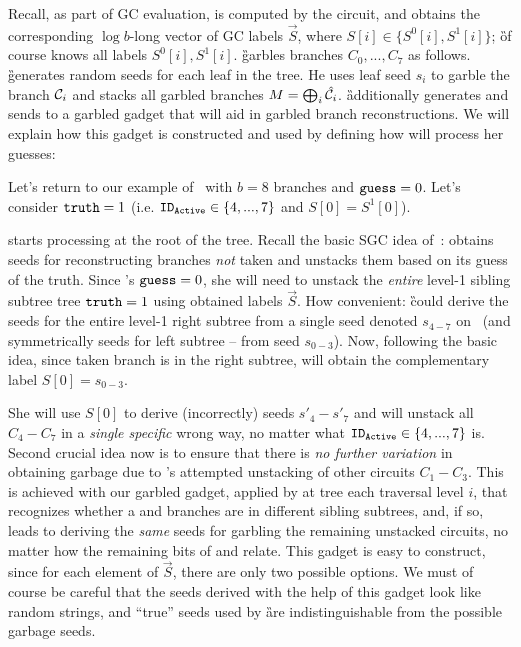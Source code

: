 
Recall, as part of GC  evaluation, \aid is computed by the circuit, and \E obtains the corresponding $ \log b$-long vector of GC labels $\vec S$, where
$S[i] \in \{S^0[i],S^1[i]\}$; \G of course knows all labels $S^0[i],S^1[i]$.
\G  garbles branches  $C_0,...,C_7$ as follows.  \G generates  random seeds for 
each leaf in the tree.  He uses leaf seed $s_i$ to garble the branch $\mathcal C_i$ and stacks all garbled branches $M=\bigoplus_i \hat{\mathcal C}_i$.  \G additionally generates and sends to \E a garbled gadget that will aid \E in garbled  branch reconstructions.  We will explain how this gadget is constructed and used by defining how \E will process her guesses:




Let's return to our example of~ with $b=8$ branches and $\mathtt{guess}=0$. Let's consider $\mathtt{truth} = 1$ (i.e. $\mathtt{ID_{Active}} \in \{4,...,7\}$ and $S[0] = S^1[0]$).

\E starts processing at the root of the tree.  Recall the basic SGC idea of~\HK: \E obtains seeds for reconstructing branches {\em not} taken and unstacks them based on its guess of the truth.  Since \E's $\mathtt{guess}=0$, she will need to unstack the {\em entire} level-1 sibling subtree tree $\mathtt{truth} = 1$ using obtained labels  $\vec S$.
How convenient: \G could derive the seeds for the entire level-1 right subtree from a single  seed denoted $s_{4-7}$ on~ (and symmetrically seeds for left subtree -- from seed $s_{0-3}$).  Now, following the \HK basic idea, since taken branch is in the right subtree, 
 \E will obtain the complementary label $S[0]=s_{0-3}$.  
 
 She will use $S[0]$ to derive (incorrectly) seeds $s'_4-s'_7$ and will unstack all $C_4-C_7$ in a {\em single specific} wrong way, no matter what $\mathtt{ID_{Active}}\in\{4,...,7\}$ is.  Second crucial idea now is to ensure that there is {\em no further variation} in \E obtaining garbage due to \E's attempted unstacking of other circuits $C_1-C_3$.  This is achieved with our garbled gadget, applied by \E at tree each traversal level $i$, that recognizes whether a \guess and \aid branches are in different sibling subtrees, and, if so, leads \E to deriving the {\em same} seeds for garbling the remaining unstacked circuits, no matter how the remaining bits of \truth and \guess relate.  This gadget is easy to construct, since for each element of $\vec S$, there are only two possible options.  We must of course be careful  that the seeds derived with the help of this gadget look like random strings, and ``true'' seeds used by \G are indistinguishable from the possible garbage seeds.

